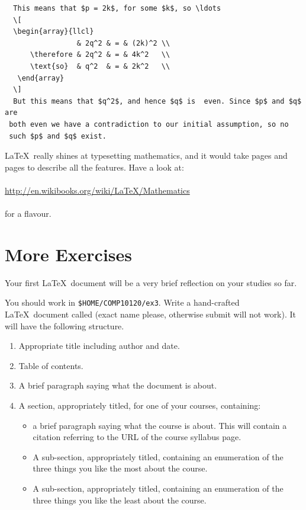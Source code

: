 \begin{refsection}
{\begin{verbatim}
  This means that $p = 2k$, for some $k$, so \ldots
  \[
  \begin{array}{llcl}
                 & 2q^2 & = & (2k)^2 \\ 
      \therefore & 2q^2 & = & 4k^2   \\ 
      \text{so}  & q^2  & = & 2k^2   \\
   \end{array}
  \]
  But this means that $q^2$, and hence $q$ is  even. Since $p$ and $q$ are
 both even we have a contradiction to our initial assumption, so no
 such $p$ and $q$ exist.
\end{verbatim}
}

  \LaTeX\ really shines at typesetting mathematics, and it would take pages and pages to describe all the features. Have a look at:
\\
\\
\href{http://en.wikibooks.org/wiki/LaTeX/Mathematics}{http://en.wikibooks.org/wiki/LaTeX/Mathematics}
\\
\\
for a flavour. 
 
\section{More Exercises}

Your first \LaTeX\ document will be a very brief reflection on your studies so far.

You should work in \verb+$HOME/COMP10120/ex3+. Write a hand-crafted \LaTeX\ document called 
 (exact name please, otherwise submit will not work). It will have the following structure.

\begin{enumerate}
\item 
Appropriate title including author and date.
\item Table of contents.
\item A brief paragraph saying what the document is about.
\item  A section, appropriately titled, for one of your courses, containing:
  \begin{itemize}
  \item  a brief paragraph saying what the course is about. This will contain a citation referring to the URL of the course syllabus page.
 \item A sub-section, appropriately titled, containing an enumeration of the three things you like the most about the course.
\item A sub-section, appropriately titled, containing an enumeration of the three things you like the least about the course.


\end{itemize}
\end{enumerate}
\end{refsection}
